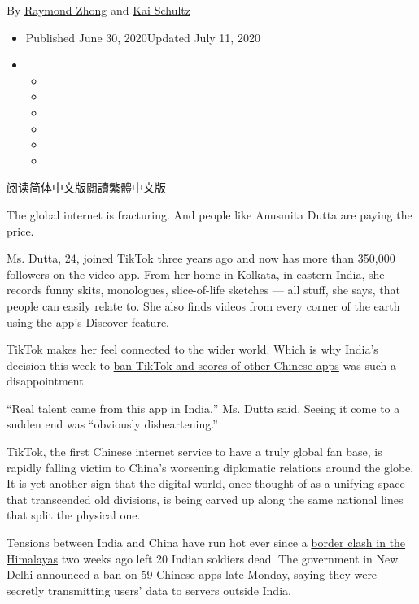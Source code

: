 By \href{https://www.nytimes3xbfgragh.onion/by/raymond-zhong}{Raymond
Zhong} and \href{https://www.nytimes3xbfgragh.onion/by/kai-schultz}{Kai
Schultz}

\begin{itemize}
\item
  Published June 30, 2020Updated July 11, 2020
\item
  \begin{itemize}
  \item
  \item
  \item
  \item
  \item
  \item
  \end{itemize}
\end{itemize}

\href{https://cn.nytimes3xbfgragh.onion/technology/20200701/india-china-tiktok/}{阅读简体中文版}\href{https://cn.nytimes3xbfgragh.onion/technology/20200701/india-china-tiktok/zh-hant/}{閱讀繁體中文版}

The global internet is fracturing. And people like Anusmita Dutta are
paying the price.

Ms. Dutta, 24, joined TikTok three years ago and now has more than
350,000 followers on the video app. From her home in Kolkata, in eastern
India, she records funny skits, monologues, slice-of-life sketches ---
all stuff, she says, that people can easily relate to. She also finds
videos from every corner of the earth using the app's Discover feature.

TikTok makes her feel connected to the wider world. Which is why India's
decision this week to
\href{https://www.nytimes3xbfgragh.onion/2020/06/29/world/asia/tik-tok-banned-india-china.html}{ban
TikTok and scores of other Chinese apps} was such a disappointment.

``Real talent came from this app in India,'' Ms. Dutta said. Seeing it
come to a sudden end was ``obviously disheartening.''

TikTok, the first Chinese internet service to have a truly global fan
base, is rapidly falling victim to China's worsening diplomatic
relations around the globe. It is yet another sign that the digital
world, once thought of as a unifying space that transcended old
divisions, is being carved up along the same national lines that split
the physical one.

Tensions between India and China have run hot ever since a
\href{https://www.nytimes3xbfgragh.onion/2020/06/16/world/asia/indian-china-border-clash.html}{border
clash in the Himalayas} two weeks ago left 20 Indian soldiers dead. The
government in New Delhi announced
\href{https://pib.gov.in/PressReleasePage.aspx?PRID=1635206}{a ban on 59
Chinese apps} late Monday, saying they were secretly transmitting users'
data to servers outside India.

